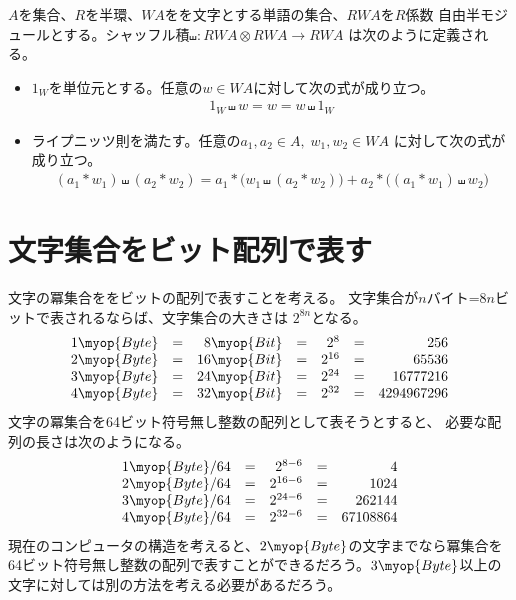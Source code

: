 	\begin{definition}[シャッフル積]\label{def:シャッフル積} %
		$A$を集合、$R$を半環、$WA$をを文字とする単語の集合、$RWA$を$R$係数
		自由半モジュールとする。シャッフル積$\shuffle:RWA\otimes RWA\to RWA$
		は次のように定義される。
		\begin{itemize}\setlength{\itemsep}{-1mm} %
			\item $1_W$を単位元とする。任意の$w\in WA$に対して次の式が成り立つ。
			\begin{equation*}\begin{split} %
				1_W \shuffle w = w = w \shuffle 1_W
			\end{split}\end{equation*} %
			\item ライプニッツ則を満たす。任意の$a_1,a_2\in A,\;w_1,w_2\in WA$
			に対して次の式が成り立つ。
			\begin{equation*}\begin{split} %
				(a_1*w_1) \shuffle (a_2*w_2)
				= a_1*\bigl(w_1 \shuffle (a_2*w_2)\bigr)
				+ a_2*\bigl((a_1*w_1) \shuffle w_2\bigr)
			\end{split}\end{equation*} %
		\end{itemize} %
	\end{definition} %
\section{文字集合をビット配列で表す}\label{s1:文字集合をビット配列で表す} %
	文字の冪集合ををビットの配列で表すことを考える。
	文字集合が$n$バイト=$8n$ビットで表されるならば、文字集合の大きさは
	$2^{8n}$となる。
	\begin{equation*}\begin{array}{rcrcrcr} %
		1\myop{Byte} &=& 8\myop{Bit} &=& 2^8 &=& 256 \\
		2\myop{Byte} &=& 16\myop{Bit} &=& 2^{16} &=& 65536 \\
		3\myop{Byte} &=& 24\myop{Bit} &=& 2^{24} &=& 16777216 \\
		4\myop{Byte} &=& 32\myop{Bit} &=& 2^{32} &=& 4294967296 \\
	\end{array}\end{equation*} %
	文字の冪集合を64ビット符号無し整数の配列として表そうとすると、
	必要な配列の長さは次のようになる。
	\begin{equation*}\begin{array}{rcrcrcr} %
		1\myop{Byte}/64 &=& 2^{8-6} &=& 4 \\
		2\myop{Byte}/64 &=& 2^{16-6} &=& 1024 \\
		3\myop{Byte}/64 &=& 2^{24-6} &=& 262144 \\
		4\myop{Byte}/64 &=& 2^{32-6} &=& 67108864 \\
	\end{array}\end{equation*} %
	現在のコンピュータの構造を考えると、$2\myop{Byte}$の文字までなら冪集合を
	64ビット符号無し整数の配列で表すことができるだろう。$3\myop{Byte}$以上の
	文字に対しては別の方法を考える必要があるだろう。
\endgroup %

